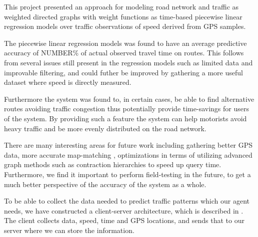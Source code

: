This project presented an approach for modeling road network and traffic as weighted directed graphs with weight functions as time-based piecewise linear regression models over traffic observations of speed derived from GPS samples.

The piecewise linear regression models was found to have an average predictive accuracy of NUMBER\% of actual observed travel time on routes. This follows from several issues still present in the regression models such as limited data and improvable filtering, and could futher be improved by gathering a more useful dataset where speed is directly measured.

Furthermore the system was found to, in certain cases, be able to find alternative routes avoiding traffic congestion thus potentially provide time-savings for users of the system. By providing such a feature the system can help motorists avoid heavy traffic and be more evenly distributed on the road network.

There are many interesting areas for future work including gathering better GPS data, more accurate map-matching , optimizations in terms of utilizing advanced graph methods such as contraction hierarchies to speed up query time. Furthermore, we find it important to perform field-testing in the future, to get a much better perspective of the accuracy of the system as a whole.

To be able to collect the data needed to predict traffic patterns which our agent needs, we have constructed a client-server architecture, which is described in . The client collects data, speed, time and GPS locations, and sends that to our server where we can store the information.